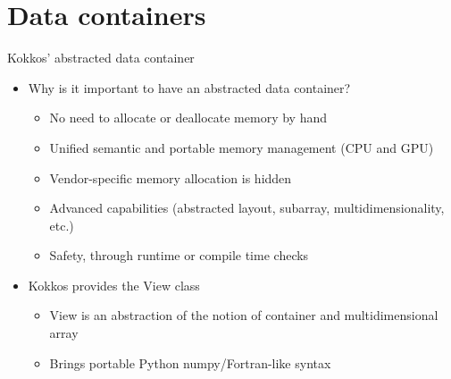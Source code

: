 \documentclass[
    aspectratio=169,
]{beamer}
\begin{document}
\section{Data containers}

\begin{frame}[fragile]{Kokkos' abstracted data container}
    \begin{itemize}
        \item Why is it important to have an abstracted data container?
        \begin{itemize}
            \item<1-> No need to allocate or deallocate memory by hand
            \item<2-> Unified semantic and portable memory management (CPU and GPU)
            \item<3-> Vendor-specific memory allocation is hidden
            \item<4-> Advanced capabilities (abstracted layout, subarray, multidimensionality, etc.)
            \item<5-> Safety, through runtime or compile time checks
        \end{itemize}
        \item<6-> Kokkos provides the View class
        \begin{itemize}
            \item<7-> View is an abstraction of the notion of container and multidimensional array
            \item<8-> Brings portable Python numpy/Fortran-like syntax
        \end{itemize}
    \end{itemize}
\end{frame}
\end{document}
